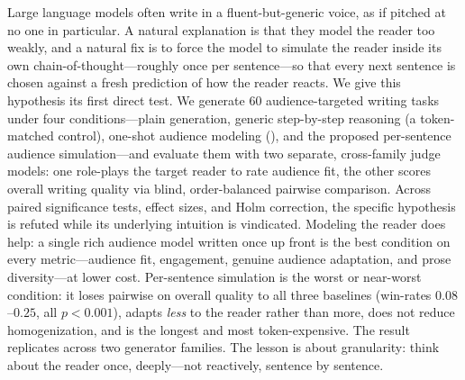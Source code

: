 Large language models often write in a fluent-but-generic voice, as if pitched at no one in
particular. A natural explanation is that they model the reader too weakly, and a natural fix is
to force the model to simulate the reader inside its own chain-of-thought---roughly once per
sentence---so that every next sentence is chosen against a fresh prediction of how the reader
reacts. We give this hypothesis its first direct test. We generate 60 audience-targeted writing
tasks under four conditions---plain generation, generic step-by-step reasoning (a token-matched
control), one-shot audience modeling (\simtom), and the proposed per-sentence audience
simulation---and evaluate them with two separate, cross-family judge models: one role-plays the
target reader to rate audience fit, the other scores overall writing quality via blind,
order-balanced pairwise comparison. Across paired significance tests, effect sizes, and
Holm correction, the specific hypothesis is refuted while its underlying intuition is vindicated.
Modeling the reader does help: a single rich audience model written once up front is the best
condition on every metric---audience fit, engagement, genuine audience adaptation, and prose
diversity---at lower cost. Per-sentence simulation is the worst or near-worst condition: it loses
pairwise on overall quality to all three baselines (win-rates $0.08$--$0.25$, all $p < 0.001$),
adapts \emph{less} to the reader rather than more, does not reduce homogenization, and is the
longest and most token-expensive. The result replicates across two generator families. The
lesson is about granularity: think about the reader once, deeply---not reactively, sentence by
sentence.
